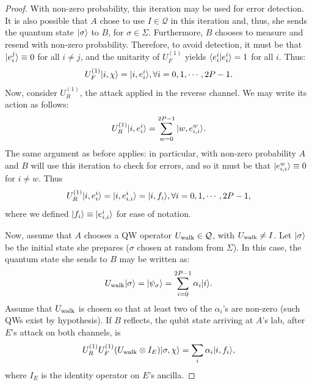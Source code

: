 \begin{proof}
With non-zero probability, this iteration may be used for error detection.  It is also possible that $A$ chose to use $I \in \mathcal{Q}$ in this iteration and, thus, she sends the quantum state $| \sigma \rangle$ to $B$, for $\sigma \in \Sigma$. Furthermore, $B$ chooses to measure and resend with non-zero probability. Therefore, to avoid detection, it must be that $| e_i^j \rangle\equiv 0$ for all $i \ne j$, and the unitarity of  $U_F^{(1)}$ yields $\braket{e_i^i|e_i^i} = 1$ for all $i$.  Thus:
\[
U_F^{(1)} | i,\chi \rangle = | i,e_i^i \rangle, \forall i=0,1,\cdots,2P-1.
\]
Now, consider $U_R^{(1)}$, the attack applied in the reverse channel.  We may write its action as follows:
\[
U_R^{(1)}| i, e_i^i \rangle = \sum_{w=0}^{2P-1}| w, e_{i,i}^w \rangle.
\]
The same argument as before applies: in particular, with non-zero probability $A$ and $B$ will use this iteration to check for errors, and so it must be that $| e_{i,i}^w \rangle \equiv 0 $ for $i \ne w$.  Thus
\[
U_R^{(1)}| i, e_i^i \rangle = | i, e_{i,i}^i \rangle = | i, f_i \rangle, \forall i = 0,1,\cdots, 2P-1,
\]
where we defined $| f_i \rangle \equiv | e_{i,i}^i \rangle$ for ease of notation.

Now, assume that $A$ chooses a QW operator $U_{\text{walk}} \in \mathcal{Q}$, with $U_{\text{walk}} \ne I$.  Let $| \sigma \rangle$ be the initial state she prepares ($\sigma$ chosen at random from $\Sigma$).  In this case, the quantum state she sends to $B$ may be written as:
\[
U_{\text{walk}}| \sigma \rangle = | \psi_\sigma \rangle = \sum_{i=0}^{2P-1}\alpha_i| i \rangle.
\]
Assume that $U_{\text{walk}}$ is chosen so that at least two of the $\alpha_i$'s are non-zero (such QWs exist by hypothesis).  If $B$ reflects, the qubit state arriving at $A$'s lab, after $E$'s attack on both channels, is
\begin{equation}\label{eq:wk:walkresult}
U_R^{(1)}U_F^{(1)}(U_{\text{walk}}\otimes I_E)| \sigma,\chi \rangle = \sum_i \alpha_i| i,f_i \rangle,
\end{equation}
where $I_E$ is the identity operator on $E$'s ancilla.


\end{proof}
